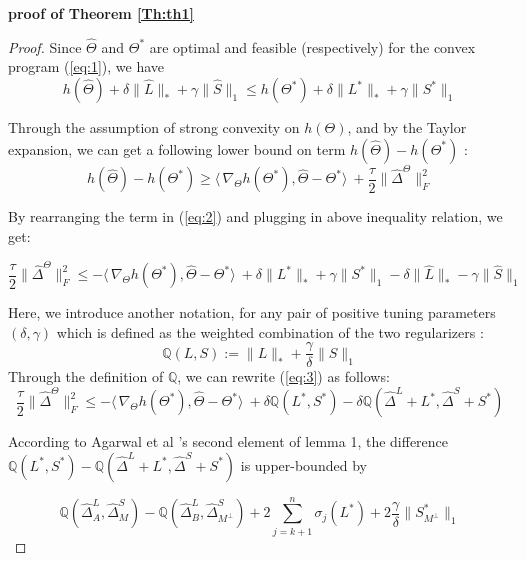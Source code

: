 \documentclass[AMS,STIX1COL]{WileyNJD-v2}
\begin{document}
\noindent\textbf{proof of Theorem \ref{Th:th1}}
\begin{proof}
Since $\widehat{\Theta}$ and $\Theta^{*}$ are optimal and feasible (respectively) for the convex program (\ref{eq:1}), we have
\begin{equation}\label{eq:2}
    h(\widehat{\Theta}) + \delta\|\widehat{L}\|_{*} + \gamma\|\widehat{S}\|_{1} \leq  
     h(\Theta^{*}) + \delta\|{L^{*}}\|_{*} + \gamma\|{S}^{*}\|_{1}
\end{equation}

Through the assumption of strong convexity on $h(\Theta)$, and by the Taylor expansion, we can get a following lower bound on term $h(\widehat{\Theta})-h(\Theta^{*})$ :
\[
h(\widehat{\Theta})-h(\Theta^{*}) \geq 
\langle\, \nabla_{\Theta}h(\Theta^{*}),\widehat{\Theta}-\Theta^{*}\rangle\ + \frac{\tau}{2}\|\widehat{\Delta}^{\Theta}\|_{F}^{2}
\]

By rearranging the term in (\ref{eq:2}) and plugging in above inequality relation, we get:

\begin{equation}\label{eq:3}
    \frac{\tau}{2}\|\widehat{\Delta}^{\Theta}\|_{F}^{2} \leq
    -\langle\,\nabla_{\Theta}h(\Theta^{*}),\widehat{\Theta}-\Theta^{*}\rangle\
    + \delta \|L^{*}\|_\ast + \gamma \|S^{*}\|_1 
    - \delta \|\widehat{L}\|_\ast - \gamma \|\widehat{S}\|_1
\end{equation}

Here, we introduce another notation, for any pair of positive tuning parameters $(\delta,\gamma)$ which is defined as the weighted combination of the two regularizers : 
\[
\mathbb{Q}(L,S)   := \|L\|_{*} + \frac{\gamma}{\delta}\|S\|_1
\]
Through the definition of $\mathbb{Q}$, we can rewrite (\ref{eq:3}) as follows:
\begin{equation}\label{eq:4}
    \frac{\tau}{2}\|\widehat{\Delta}^{\Theta}\|_{F}^{2} \leq
    -\langle\,\nabla_{\Theta}h(\Theta^{*}),\widehat{\Theta}-\Theta^{*}\rangle\
    + \delta \mathbb{Q}(L^{*},S^{*}) - \delta \mathbb{Q}(\widehat{\Delta}^L + L^{*},\widehat{\Delta}^S + S^{*})
\end{equation}

According to Agarwal et al \cite{agarwal2012noisy}'s second element of lemma 1, 
the difference $\mathbb{Q}(L^*,S^*)- \mathbb{Q}(\widehat{\Delta}^L + L^{*},\widehat{\Delta}^S + S^{*})$ is upper-bounded by 

\begin{equation}\label{eq:5}
    \mathbb{Q}(\widehat{\Delta}^L_{A},\widehat{\Delta}^S_{M}) - \mathbb{Q}(\widehat{\Delta}^L_{B},\widehat{\Delta}^S_{M^\perp})
    +2 \sum_{j=k+1}^{n} \sigma_{j}(L^*) + 2\frac{\gamma}{\delta}\|S^*_{M^\perp}\|_{1}
\end{equation}


\end{proof}
\end{document}
